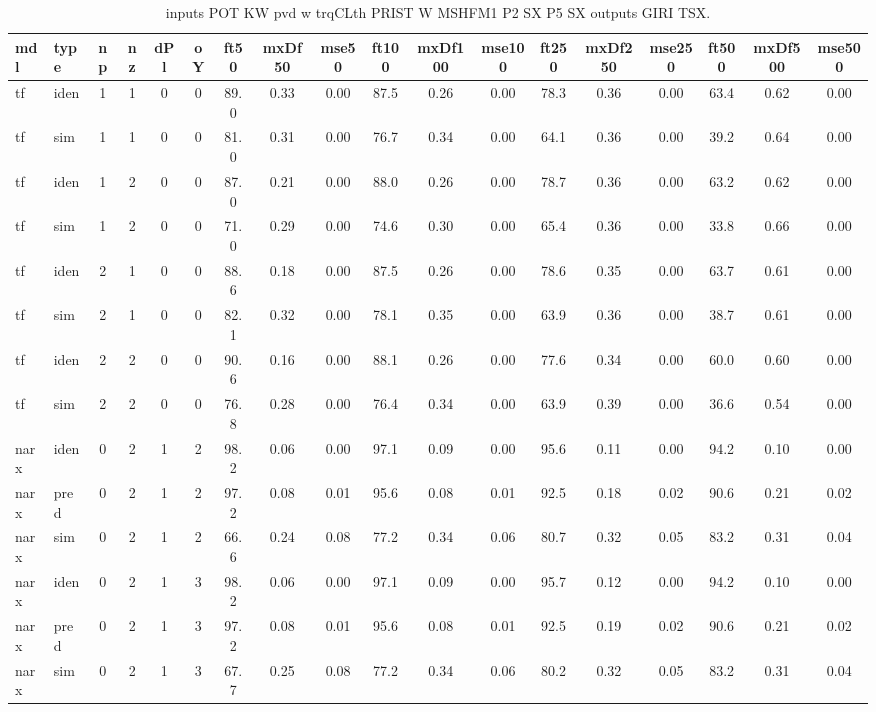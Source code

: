\begin{landscape} 
 \begin{center} 
 \footnotesize 
 \begin{longtable}{ll|cccc|ccc|ccc|ccc|ccc} 
\caption[inputs POT KW pvd w trqCLth PRIST W MSHFM1 P2 SX P5 SX   outputs GIRI TSX]{inputs POT KW pvd w trqCLth PRIST W MSHFM1 P2 SX P5 SX   outputs GIRI TSX.} 
\label{tab:inputs_POT_KW_pvd_w_trqCLth_PRIST_W_MSHFM1_P2_SX_P5_SX___outputs_GIRI_TSX} 
\hline 
  mdl & type & np & nz & dPl & oY & ft50 & mxDf50 & mse50 & ft100 & mxDf100 & mse100 & ft250 & mxDf250 & mse250 & ft500 & mxDf500 & mse500 \\ 
 \hline 
tf  & iden & 1 & 1 & 0 & 0 & 89.0 & 0.33 & 0.00 & 87.5 & 0.26 & 0.00 & 78.3 & 0.36 & 0.00 & 63.4 & 0.62 & 0.00 \\ 
tf  & sim  & 1 & 1 & 0 & 0 & 81.0 & 0.31 & 0.00 & 76.7 & 0.34 & 0.00 & 64.1 & 0.36 & 0.00 & 39.2 & 0.64 & 0.00 \\ 
 \hline 
tf  & iden & 1 & 2 & 0 & 0 & 87.0 & 0.21 & 0.00 & 88.0 & 0.26 & 0.00 & 78.7 & 0.36 & 0.00 & 63.2 & 0.62 & 0.00 \\ 
tf  & sim  & 1 & 2 & 0 & 0 & 71.0 & 0.29 & 0.00 & 74.6 & 0.30 & 0.00 & 65.4 & 0.36 & 0.00 & 33.8 & 0.66 & 0.00 \\ 
 \hline 
tf  & iden & 2 & 1 & 0 & 0 & 88.6 & 0.18 & 0.00 & 87.5 & 0.26 & 0.00 & 78.6 & 0.35 & 0.00 & 63.7 & 0.61 & 0.00 \\ 
tf  & sim  & 2 & 1 & 0 & 0 & 82.1 & 0.32 & 0.00 & 78.1 & 0.35 & 0.00 & 63.9 & 0.36 & 0.00 & 38.7 & 0.61 & 0.00 \\ 
 \hline 
tf  & iden & 2 & 2 & 0 & 0 & 90.6 & 0.16 & 0.00 & 88.1 & 0.26 & 0.00 & 77.6 & 0.34 & 0.00 & 60.0 & 0.60 & 0.00 \\ 
tf  & sim  & 2 & 2 & 0 & 0 & 76.8 & 0.28 & 0.00 & 76.4 & 0.34 & 0.00 & 63.9 & 0.39 & 0.00 & 36.6 & 0.54 & 0.00 \\ 
 \hline 
narx & iden & 0 & 2 & 1 & 2 & 98.2 & 0.06 & 0.00 & 97.1 & 0.09 & 0.00 & 95.6 & 0.11 & 0.00 & 94.2 & 0.10 & 0.00 \\ 
narx & pred & 0 & 2 & 1 & 2 & 97.2 & 0.08 & 0.01 & 95.6 & 0.08 & 0.01 & 92.5 & 0.18 & 0.02 & 90.6 & 0.21 & 0.02 \\ 
narx & sim  & 0 & 2 & 1 & 2 & 66.6 & 0.24 & 0.08 & 77.2 & 0.34 & 0.06 & 80.7 & 0.32 & 0.05 & 83.2 & 0.31 & 0.04 \\ 
 \hline 
narx & iden & 0 & 2 & 1 & 3 & 98.2 & 0.06 & 0.00 & 97.1 & 0.09 & 0.00 & 95.7 & 0.12 & 0.00 & 94.2 & 0.10 & 0.00 \\ 
narx & pred & 0 & 2 & 1 & 3 & 97.2 & 0.08 & 0.01 & 95.6 & 0.08 & 0.01 & 92.5 & 0.19 & 0.02 & 90.6 & 0.21 & 0.02 \\ 
narx & sim  & 0 & 2 & 1 & 3 & 67.7 & 0.25 & 0.08 & 77.2 & 0.34 & 0.06 & 80.2 & 0.32 & 0.05 & 83.2 & 0.31 & 0.04 \\ 
 \hline 
\end{longtable} 
\normalsize \end{center} 
 \end{landscape}